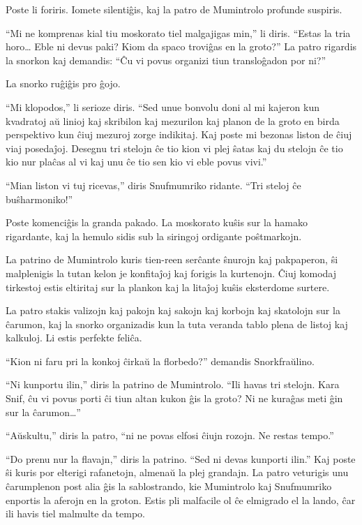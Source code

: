 Poste li foriris. Iomete silentiĝis, kaj la patro de Mumintrolo profunde suspiris.

``Mi ne komprenas kial tiu moskorato tiel malgajigas min,'' li diris. ``Estas la tria horo{\ldots} Eble ni devus paki? Kiom da spaco troviĝas en la groto?'' La patro rigardis la snorkon kaj demandis: ``Ĉu vi povus organizi tiun transloĝadon por ni?''

La snorko ruĝiĝis pro ĝojo.

``Mi klopodos,'' li serioze diris. ``Sed unue bonvolu doni al mi kajeron kun kvadratoj aŭ linioj kaj skribilon kaj mezurilon kaj planon de la groto en birda perspektivo kun ĉiuj mezuroj zorge indikitaj. Kaj poste mi bezonas liston de ĉiuj viaj posedaĵoj. Desegnu tri stelojn ĉe tio kion vi plej ŝatas kaj du stelojn ĉe tio kio nur plaĉas al vi kaj unu ĉe tio sen kio vi eble povus vivi.''

``Mian liston vi tuj ricevas,'' diris Snufmumriko ridante. ``Tri steloj ĉe buŝharmoniko!''

\sectionbreak

Poste komenciĝis la granda pakado. La moskorato kuŝis sur la hamako rigardante, kaj la hemulo sidis sub la siringoj ordigante poŝtmarkojn.

La patrino de Mumintrolo kuris tien-reen serĉante ŝnurojn kaj pakpaperon, ŝi malplenigis la tutan kelon je konfitaĵoj kaj forigis la kurtenojn. Ĉiuj komodaj tirkestoj estis eltiritaj sur la plankon kaj la litaĵoj kuŝis eksterdome surtere.

La patro stakis valizojn kaj pakojn kaj sakojn kaj korbojn kaj skatolojn sur la ĉarumon, kaj la snorko organizadis kun la tuta veranda tablo plena de listoj kaj kalkuloj. Li estis perfekte feliĉa.

``Kion ni faru pri la konkoj ĉirkaŭ la florbedo?'' demandis Snorkfraŭlino.

``Ni kunportu ilin,'' diris la patrino de Mumintrolo. ``Ili havas tri stelojn. Kara Snif, ĉu vi povus porti ĉi tiun altan kukon ĝis la groto? Ni ne kuraĝas meti ĝin sur la ĉarumon{\ldots}''

``Aŭskultu,'' diris la patro, ``ni ne povas elfosi ĉiujn rozojn. Ne restas tempo.''

``Do prenu nur la flavajn,'' diris la patrino. ``Sed ni devas kunporti ilin.'' Kaj poste ŝi kuris por elterigi rafanetojn, almenaŭ la plej grandajn. La patro veturigis unu ĉarumplenon post alia ĝis la sablostrando, kie Mumintrolo kaj Snufmumriko enportis la aferojn en la groton. Estis pli malfacile ol ĉe elmigrado el la lando, ĉar ili havis tiel malmulte da tempo.

